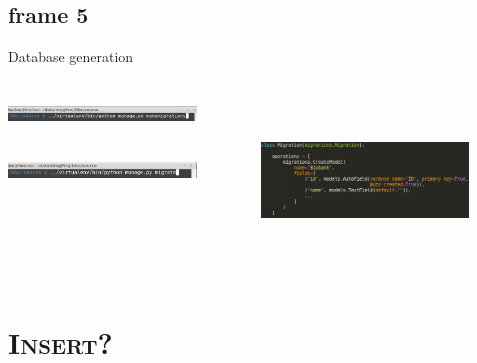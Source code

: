 \documentclass[xcolor=x11names,compress]{beamer}
\renewcommand{\(}{\begin{columns}}
\renewcommand{\)}{\end{columns}}
\newcommand{\<}[1]{\begin{column}{#1}}
\renewcommand{\>}{\end{column}}
\begin{document}
\subsection{frame 5}
\begin{frame}{Database generation}

\begin{columns}[T]
 \begin{column}{.5\textwidth}
  \begin{block}{}
    \includegraphics[width=5cm, height=1cm]{images/command1.png}
  \end{block}
  \begin{block}{}
    \includegraphics[width=5cm, height=1cm]{images/command2.png}
  \end{block}
 \end{column}
 \begin{column}{.5\textwidth}
  \begin{block}{}
   \includegraphics[width=5.5cm, height=4.5cm]{images/migrations.png}
  \end{block}
 \end{column}
\end{columns}

\end{frame}


\section{\scshape Insert?}
\end{document}
